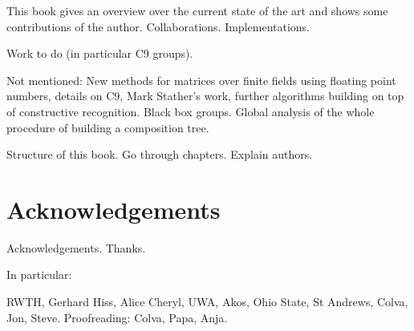 This book gives an overview over the current state of the art and
shows some contributions of the author. Collaborations.
Implementations.

Work to do (in particular C9 groups).

Not mentioned: New methods for matrices over finite fields using
floating point numbers, details on C9, Mark Stather's work, further
algorithms building on top of constructive recognition. Black box
groups. Global analysis of the whole procedure of building a
composition tree.

Structure of this book. Go through chapters. Explain authors.

\section{Acknowledgements}

Acknowledgements. Thanks.

In particular:

RWTH, Gerhard Hiss, Alice Cheryl, UWA, Akos, Ohio State, St Andrews, Colva, Jon,
Steve. Proofreading: Colva, Papa, Anja.

\renewcommand{\thechapter}{\Roman{chapter}}
